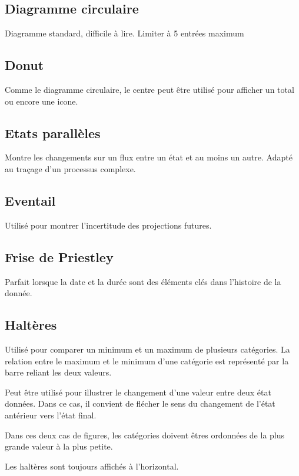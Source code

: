 \documentclass[a4paper,12pt]{article}
\begin{document}
\begin{multicols}{2}
\subsection*{Diagramme circulaire}
\label{sec:orge143b3d}
Diagramme standard, difficile à lire. \autocite{alansmithLexiqueVisuel}
Limiter à 5 entrées maximum \autocite{mikeyiHowChooseRight2020}
\subsection*{Donut}
\label{sec:orga9ea5ca}
Comme le diagramme circulaire, le centre peut être utilisé pour afficher un total ou encore une icone. \autocite{alansmithLexiqueVisuel}
\subsection*{Etats parallèles}
\label{sec:orgef104bc}
Montre les changements sur un flux entre un état et au moins un autre. Adapté au traçage d'un processus complexe. \autocite{alansmithLexiqueVisuel}
\subsection*{Eventail}
\label{sec:orgc3caf00}
Utilisé pour montrer l'incertitude des projections futures. \autocite{alansmithLexiqueVisuel}
\subsection*{Frise de Priestley}
\label{sec:org83b4f3f}
Parfait lorsque la date et la durée sont des éléments clés dans l'histoire de la donnée. \autocite{alansmithLexiqueVisuel}
\subsection*{Haltères}
\label{sec:org69e566f}
Utilisé pour comparer un minimum et un maximum de plusieurs catégories. \autocite{alansmithLexiqueVisuel} La relation entre le maximum et le minimum d'une catégorie est représenté par la barre reliant les deux valeurs. \autocite{mikeyiHowChooseRight2020}

Peut être utilisé pour illustrer le changement d'une valeur entre deux état données. Dans ce cas, il convient de flécher le sens du changement de l'état antérieur vers l'état final.

Dans ces deux cas de figures, les catégories doivent êtres ordonnées de la plus grande valeur à la plus petite.

Les haltères sont toujours affichés à l'horizontal.

\end{multicols}
\end{document}
